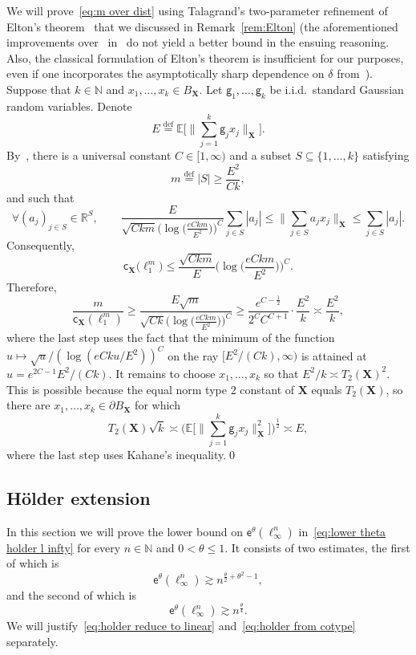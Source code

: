 \documentclass[11pt,reqno]{amsart}
\renewcommand{\le}{\leqslant}
\renewcommand{\ge}{\geqslant}
\renewcommand{\d}{\delta}
\newcommand{\cc}{\mathsf{c}}
\newcommand{\X}{\mathbf X}
\newcommand{\R}{\mathbb R}
\theoremstyle{remark}
\renewcommand{\subset}{\subseteq}
\newcommand{\E}{\mathbb{ E}}
\newcommand{\N}{\mathbb N}
\newcommand{\eqdef}{\stackrel{\mathrm{def}}{=}}
\newcommand{\ee}{\mathsf{e}}
\renewcommand{\1}{\mathbf 1}
\newcommand{\g}{\mathsf{g}}
\begin{document}
We will prove~\eqref{eq:m over dist} using Talagrand's two-parameter refinement of Elton's theorem~\cite{Tal-elton92} that we discussed in Remark~\ref{rem:Elton} (the aforementioned improvements over~\cite{Tal-elton92} in~\cite{MV03,RV06} do not yield a better bound in the ensuing reasoning. Also, the classical formulation of Elton's theorem is insufficient for our purposes, even if one incorporates the asymptotically sharp dependence on $\d$ from~\cite{MV03}).  Suppose that $k\in \N$ and $x_1,\ldots,x_k\in B_\X$. Let $\g_1,\ldots,\g_k$ be i.i.d.~standard Gaussian random variables. Denote
\begin{equation*}
E\eqdef \E\bigg[\Big\|\sum_{j=1}^k\g_j x_j\Big\|_{\X}\bigg].
\end{equation*}
By~\cite[Corollary~1.2]{Tal-elton92}, there is a universal constant $C\in [1,\infty)$ and a subset $S\subset \{1,\ldots,k\}$ satisfying
$$
m\eqdef |S|\ge \frac{E^2}{Ck},
$$ and such that
\begin{equation}\label{eq:elton tal}
\forall(a_j)_{j\in S}\in \R^S,\qquad \frac{E}{\sqrt{Ckm}\Big(\log\big(\frac{eCkm}{E^2}\big)\Big)^C} \sum_{j\in S} |a_j|\le \Big\|\sum_{j\in S} a_j x_j\Big\|_\X\le \sum_{j\in S} |a_j|.
\end{equation}
Consequently,
\begin{equation*}
\cc_{\X}\big(\ell_1^m\big)\le \frac{\sqrt{Ckm}}{E}\bigg(\log\Big(\frac{eCkm}{E^2}\Big)\bigg)^C.
\end{equation*}
Therefore,
$$
\frac{m}{\cc_\X(\ell_1^m)}\ge \frac{E\sqrt{m}}{\sqrt{Ck}\Big(\log\big(\frac{eCkm}{E^2}\big)\Big)^C}\ge \frac{e^{C-\frac12}}{2^CC^{C+1}}\cdot \frac{E^2}{k}\asymp \frac{E^2}{k},
$$
where the last step uses the fact that the minimum of the function $u\mapsto \sqrt{u}/(\log(eCku/E^2))^{C}$ on the ray $[E^2/(Ck),\infty)$ is attained at $u=e^{2C-1}E^2/(Ck)$. It remains to choose $x_1,\ldots,x_k$ so that $E^2/k\asymp T_2(\X)^2$. This is possible because the equal norm type $2$ constant of $\X$ equals $T_2(\X)$, so there are $x_1,\ldots,x_k\in \partial B_\X$ for which
$$
T_2(\X)\sqrt{k}\asymp  \bigg(\E\bigg[\Big\|\sum_{j=1}^k\g_j x_j\Big\|_{\X}^2\bigg]\bigg)^{\frac12}\asymp E,
$$
where the last step uses Kahane's inequality.\qed


\subsection{H\"older extension}\label{sec:holder ext} In this section we will prove the lower bound on $\ee^\theta(\ell_\infty^n)$ in~\eqref{eq:lower theta holder l infty} for every $n\in \N$ and $0<\theta\le 1$. It consists of two estimates, the first of which is
\begin{equation}\label{eq:holder reduce to linear}
\ee^\theta(\ell_\infty^n)\gtrsim n^{\frac{\theta}{2}+\theta^2-1},
\end{equation}
and the second of which is
\begin{equation}\label{eq:holder from cotype}
\ee^\theta(\ell_\infty^n)\gtrsim n^{\frac{\theta}{4}}.
\end{equation}
We will justify~\eqref{eq:holder reduce to linear} and~\eqref{eq:holder from cotype} separately.
\end{document}
